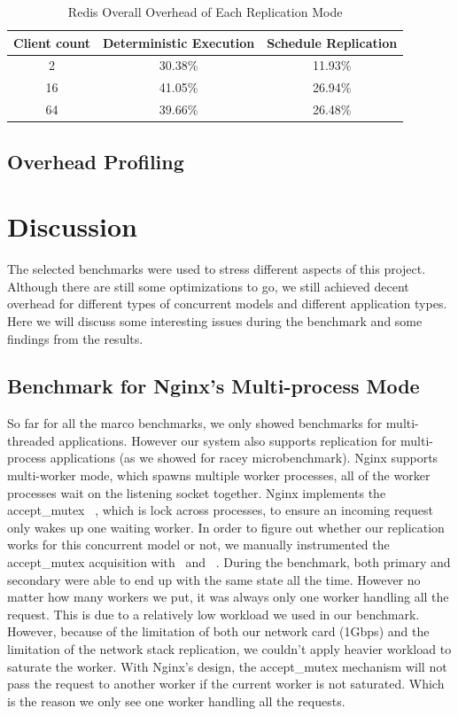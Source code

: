 \begin{table}
\caption{Redis Overall Overhead of Each Replication Mode}
\begin{center}
 \begin{tabular}{c | c | c}
Client count & Deterministic Execution & Schedule Replication \\ \hline
 2 & 30.38\% & 11.93\% \\ \hline
 16 & 41.05\% & 26.94\% \\ \hline
 64 & 39.66\% & 26.48\% \\ \hline
 \end{tabular}
\end{center}
\label{t:redis_overall}
\end{table}

\subsection{Overhead Profiling}

\section{Discussion}
The selected benchmarks were used to stress different aspects of this project. Although there are still some optimizations to go, we still achieved decent overhead for different types of concurrent models and different application types. Here we will discuss some interesting issues during the benchmark and some findings from the results.

\subsection{Benchmark for Nginx's Multi-process Mode}
So far for all the marco benchmarks, we only showed benchmarks for multi-threaded applications. However our system also supports replication for multi-process applications (as we showed for racey microbenchmark). Nginx supports multi-worker mode, which spawns multiple worker processes, all of the worker processes wait on the listening socket together. Nginx implements the accept\_mutex ~\cite{nginxscalability}, which is lock across processes, to ensure an incoming request only wakes up one waiting worker. In order to figure out whether our replication works for this concurrent model or not, we manually instrumented the accept\_mutex acquisition with \detstart\ and \detend\ . During the benchmark, both primary and secondary were able to end up with the same state all the time. However no matter how many workers we put, it was always only one worker handling all the request. This is due to a relatively low workload we used in our benchmark. However, because of the limitation of both our network card (1Gbps) and the limitation of the network stack replication, we couldn't apply heavier workload to saturate the worker. With Nginx's design, the accept\_mutex mechanism will not pass the request to another worker if the current worker is not saturated. Which is the reason we only see one worker handling all the requests.

